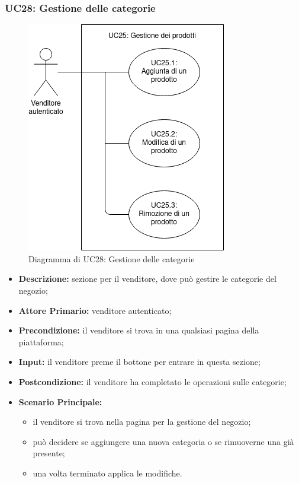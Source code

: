 \subsubsection{UC28: Gestione delle categorie}
        \label{sec:UC28}
        \begin{figure}[!ht]
            \caption{Diagramma di UC28: Gestione delle categorie}
            \vspace{10px}
            \includegraphics[scale=0.5]{../../../Images/AnalisiRequisiti/UC28}
            \centering
        \end{figure}
        \begin{itemize}
            \item \textbf{Descrizione:} sezione per il venditore, dove può gestire le categorie del negozio;
            \item \textbf{Attore Primario:} venditore autenticato;
            \item \textbf{Precondizione:} il venditore si trova in una qualsiasi pagina della piattaforma;
            \item \textbf{Input:} il venditore preme il bottone per entrare in questa sezione;
            \item \textbf{Postcondizione:} il venditore ha completato le operazioni sulle categorie;
            \item \textbf{Scenario Principale:} 
                \begin{itemize}
                    \item il venditore si trova nella pagina per la gestione del negozio;
                    \item può decidere se aggiungere una nuova categoria o se rimuoverne una già presente;
                    \item una volta terminato applica le modifiche.
                \end{itemize}
        \end{itemize}
